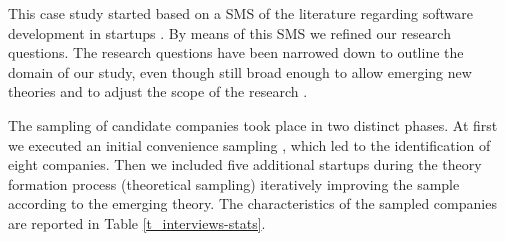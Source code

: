 \documentclass[12pt,journal,compsoc]{../sty/IEEEtran}
\begin{document}
This case study started based on a SMS of the literature regarding software
development in startups \cite{SMS}. By means of this SMS we refined our research
questions. The research questions have been narrowed down to outline the domain
of our study, even though still broad enough to allow emerging new theories and
to adjust the scope of the research \cite{Corbin1990}.

The sampling of candidate companies took place in two distinct phases. At first
we executed an initial convenience sampling \cite{Dawson2009}, which led to the
identification of eight companies. Then we included five additional startups
during the theory formation process (theoretical sampling) iteratively improving
the sample according to the emerging theory. The characteristics of the sampled
companies are reported in Table \ref{t_interviews-stats}.
\end{document}
